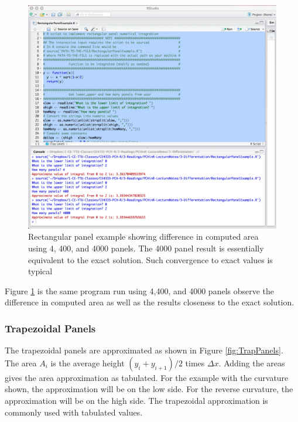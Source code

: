 \begin{figure}[h!] %
   \centering
   \includegraphics[width=6in]{./3-Differentation/RectExample44.jpg} 
   \caption{Rectangular panel example showing difference in computed area using 4, 400, and 4000 panels.  The 4000 panel result is essentially equivalent to the exact solution.  Such convergence to exact values is typical}
   \label{fig:RectExample44}
\end{figure}
Figure \ref{fig:RectExample44} is the same program run using 4,400, and 4000 panels observe the difference in computed area as well as the results closeness to the exact solution.

\subsubsection{Trapezoidal Panels}
The trapezoidal panels are approximated as shown in Figure \ref{fig:TrapPanels}. The area $A_i$ is the average height $(y_i + y_{i+1} )/2$ times $\Delta x$. Adding the areas gives the area approximation as tabulated.   For the example with the curvature shown, the approximation will be on the low side. For the reverse curvature, the approximation will be on the high side.  The trapezoidal approximation is commonly used with tabulated values.

